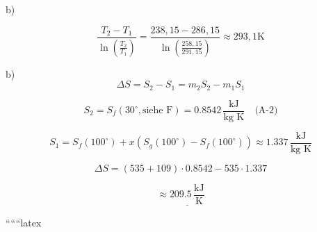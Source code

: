 b)

\[
\frac{T_2 - T_1}{\ln \left( \frac{T_2}{T_1} \right)} = \frac{238,15 - 286,15}{\ln \left( \frac{258,15}{291,15} \right)} \approx 293,1 \text{K}
\]

b) 
\[
\Delta S = S_2 - S_1 = m_2 S_2 - m_1 S_1
\]

\[
S_2 = S_f(30^\circ, \text{siehe F}) = 0.8542 \, \frac{\text{kJ}}{\text{kg K}} \quad \text{(A-2)}
\]

\[
S_1 = S_f(100^\circ) + x \left( S_g(100^\circ) - S_f(100^\circ) \right) \approx 1.337 \, \frac{\text{kJ}}{\text{kg K}}
\]

\[
\Delta S = (535 + 109) \cdot 0.8542 - 535 \cdot 1.337
\]

\[
\approx \underline{209.5 \, \frac{\text{kJ}}{\text{K}}}
\]

``````latex